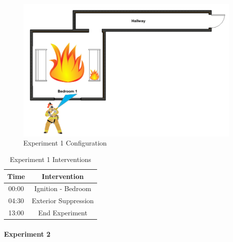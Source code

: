 \documentclass[12pt,oneside]{book}
\begin{document}

\begin{figure}[H]
	\centering
	\includegraphics[width=5in]{Howard_Exp_1.png}
	\caption{Experiment 1 Configuration}
	\label{fig:Exp1Config}
\end{figure}

\begin{table}[H]
	\centering
	\caption{Experiment 1 Interventions}
	\begin{tabular}{|c|c|} 
		\hline
		Time & Intervention \\ \hline \hline
		00:00 & Ignition - Bedroom \\ \hline
		04:30 & Exterior Suppression \\ \hline
		13:00 & End Experiment\\ \hline
	\end{tabular}
	\label{Table:Exp1Interventions}
\end{table}

\clearpage

\paragraph{Experiment 2} \mbox{}
\end{document}

